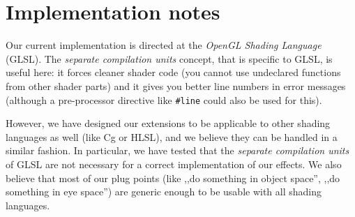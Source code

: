\documentclass{egpubl}
\begin{document}

\section{Implementation notes}

Our current implementation is directed at
the \emph{OpenGL Shading Language} (GLSL). The \emph{separate compilation units}
concept, that is specific to GLSL, is useful here:
it forces
cleaner shader code (you cannot use undeclared functions from other
shader parts) and it gives you better line numbers in error messages
(although a pre-processor directive like \texttt{\#line} could also be used for
this).

However, we have designed our extensions
to be applicable to other shading languages as well (like Cg or HLSL),
and we believe they can be handled in a similar fashion.
In particular, we have tested that the \emph{separate compilation units}
of GLSL are not necessary for a correct implementation of our effects.
We also believe that most of our plug points (like ,,do something in object space'',
,,do something in eye space'') are generic enough to be usable
with all shading languages.





\end{document}
